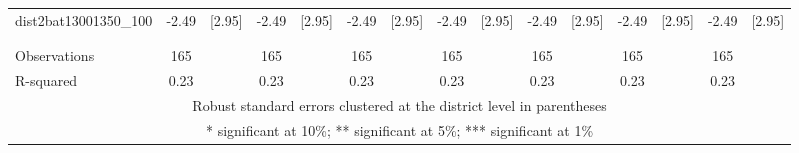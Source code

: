 \documentclass[landscape]{article}
\begin{document}
\begin{tabular}{lcccccccccccccc}
dist2bat13001350\_100 & -2.49 & [2.95] & -2.49 & [2.95] & -2.49 & [2.95] & -2.49 & [2.95] & -2.49 & [2.95] & -2.49 & [2.95] & -2.49 & [2.95] \\
 &  &  &  &  &  &  &  &  &  &  &  &  &  &  \\
 &  &  &  &  &  &  &  &  &  &  &  &  &  &  \\
Observations & 165 &  & 165 &  & 165 &  & 165 &  & 165 &  & 165 &  & 165 &  \\
 R-squared & 0.23 &  & 0.23 &  & 0.23 &  & 0.23 &  & 0.23 &  & 0.23 &  & 0.23 &  \\ \hline
\multicolumn{15}{c}{ Robust standard errors clustered at the district level in parentheses} \\
\multicolumn{15}{c}{ * significant at 10\%; ** significant at 5\%; *** significant at 1\%} \\
\end{tabular}
\end{document}
